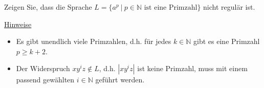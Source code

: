 \documentclass{uebungsblatt}
\begin{document}

\begin{aufgabe}
	Zeigen Sie, dass die Sprache
	$L = \{a^p \ | \ p \in \mathbb{N} \text{ ist eine Primzahl}\}$ nicht regulär ist.\\

	\medskip
	\underline{Hinweise}

	\begin{itemize}
		\item
		      Es gibt unendlich viele Primzahlen, d.h. für jedes
		      $k \in \mathbb{N}$ gibt es eine Primzahl $p \geq k + 2$.
		\item
		      Der Widerspruch $xy^iz \not\in L$, d.h. $|xy^iz|$ ist keine Primzahl,
		      muss mit einem passend gewählten $i \in \mathbb{N}$ geführt werden.
	\end{itemize}

\end{aufgabe}
\end{document}
